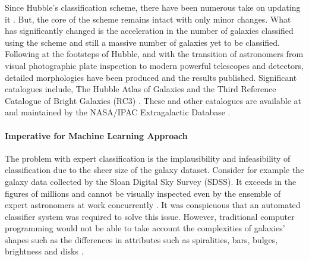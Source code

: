 Since Hubble's classification scheme, there have been numerous take on updating it \parencite{buta_galaxy_2013}. But, the core of the scheme remains intact with only minor changes. What has significantly changed is the acceleration in the number of galaxies classified using the scheme and still a massive number of galaxies yet to be classified. Following at the footsteps of Hubble, and with the transition of astronomers from visual photographic plate inspection to modern powerful telescopes and detectors, detailed morphologies have been produced and the results published. Significant catalogues include, The Hubble Atlas of Galaxies \parencite{sandage_hubble_1984}and the Third Reference Catalogue of Bright Galaxies (RC3) \parencite{vaucouleurs_third_1991}. These and other catalogues are available at and maintained by the NASA/IPAC Extragalactic Database \parencite{jet_propulsion_laboratory_california_institute_of_technology_home_2019}.

\paragraph{Imperative for Machine Learning Approach}
The problem with expert classification is the implausibility and infeasibility of classification due to the sheer size of the galaxy dataset. Consider for example the galaxy data collected by the Sloan Digital Sky Survey (SDSS). It exceeds in the figures of millions and cannot be visually inspected even by the ensemble of expert astronomers at work concurrently \parencites{strauss_spectroscopic_2002,york_sloan_2000}. It was conspicuous that an automated classifier system was required to solve this issue. However, traditional computer programming would not be able to take account the complexities of galaxies' shapes such as the differences in attributes such as spiralities, bars, bulges, brightness and disks \parencite[216]{way_advances_2012}.

